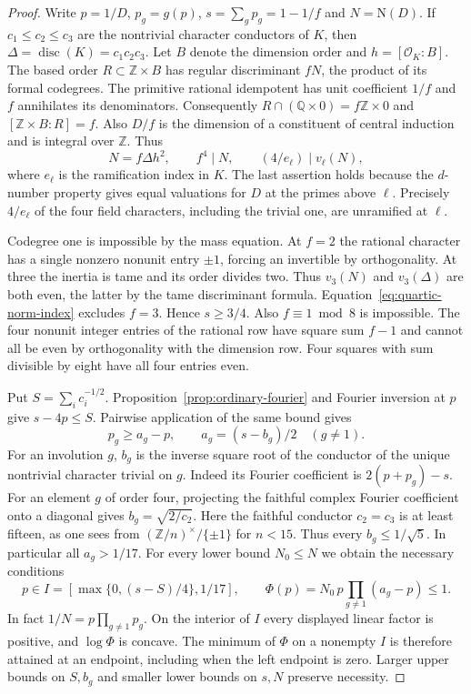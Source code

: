 \documentclass[11pt,a4paper]{article}
\numberwithin{equation}{section}
\begin{document}
\begin{proof}
Write $p=1/D$, $p_g=g(p)$, $s=\sum_g p_g=1-1/f$ and $N=\mathrm N(D)$. If $c_1\le c_2\le c_3$ are the nontrivial character conductors of $K$, then $\Delta=\operatorname{disc}(K)=c_1c_2c_3$. Let $B$ denote the dimension order and $h=[\mathcal O_K:B]$. The based order $R\subset\mathbb Z\times B$ has regular discriminant $fN$, the product of its formal codegrees. The primitive rational idempotent has unit coefficient $1/f$ and $f$ annihilates its denominators. Consequently $R\cap(\mathbb Q\times0)=f\mathbb Z\times0$ and $[\mathbb Z\times B:R]=f$. Also $D/f$ is the dimension of a constituent of central induction and is integral over $\mathbb Z$. Thus
\begin{equation}\label{eq:quartic-norm-index}
 N=f\Delta h^2,\qquad f^4\mid N,\qquad (4/e_\ell)\mid v_\ell(N),
\end{equation}
where $e_\ell$ is the ramification index in $K$. The last assertion holds because the $d$-number property gives equal valuations for $D$ at the primes above $\ell$. Precisely $4/e_\ell$ of the four field characters, including the trivial one, are unramified at $\ell$.

Codegree one is impossible by the mass equation. At $f=2$ the rational character has a single nonzero nonunit entry $\pm1$, forcing an invertible by orthogonality. At three the inertia is tame and its order divides two. Thus $v_3(N)$ and $v_3(\Delta)$ are both even, the latter by the tame discriminant formula. Equation~\eqref{eq:quartic-norm-index} excludes $f=3$. Hence $s\ge3/4$. Also $f\equiv1\bmod8$ is impossible. The four nonunit integer entries of the rational row have square sum $f-1$ and cannot all be even by orthogonality with the dimension row. Four squares with sum divisible by eight have all four entries even.

Put $S=\sum_i c_i^{-1/2}$. Proposition~\ref{prop:ordinary-fourier} and Fourier inversion at $p$ give $s-4p\le S$. Pairwise application of the same bound gives
\[
 p_g\ge a_g-p,\qquad a_g=(s-b_g)/2\quad(g\ne1).
\]
For an involution $g$, $b_g$ is the inverse square root of the conductor of the unique nontrivial character trivial on $g$. Indeed its Fourier coefficient is $2(p+p_g)-s$. For an element $g$ of order four, projecting the faithful complex Fourier coefficient onto a diagonal gives $b_g=\sqrt{2/c_2}$. Here the faithful conductor $c_2=c_3$ is at least fifteen, as one sees from $(\mathbb Z/n)^\times/\{\pm1\}$ for $n<15$. Thus every $b_g\le1/\sqrt5$. In particular all $a_g>1/17$. For every lower bound $N_0\le N$ we obtain the necessary conditions
\begin{equation}\label{eq:quartic-interval}
 p\in I=\left[\max\{0,(s-S)/4\},1/17\right],\qquad
 \Phi(p)=N_0\,p\prod_{g\ne1}(a_g-p)\le1.
\end{equation}
In fact $1/N=p\prod_{g\ne1}p_g$. On the interior of $I$ every displayed linear factor is positive, and $\log\Phi$ is concave. The minimum of $\Phi$ on a nonempty $I$ is therefore attained at an endpoint, including when the left endpoint is zero. Larger upper bounds on $S,b_g$ and smaller lower bounds on $s,N$ preserve necessity.


\end{proof}
\end{document}
